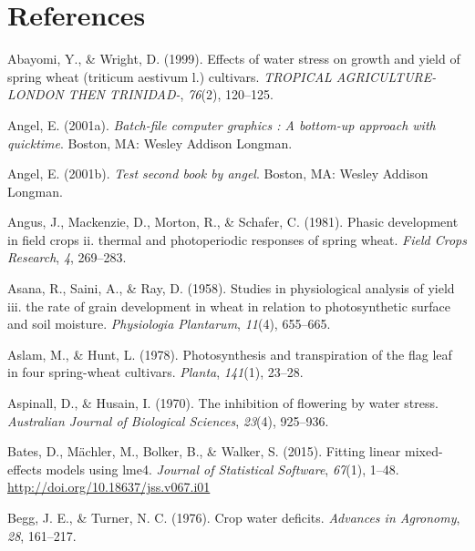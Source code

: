 \documentclass[12pt,oneside]{dukestatscithesis} %
\theoremstyle{definition}
\theoremstyle{definition}
\theoremstyle{definition}
\theoremstyle{remark}
\begin{document}
\chapter*{References}\label{references}


\noindent

\setlength{\parindent}{-0.20in} \setlength{\leftskip}{0.20in}
\setlength{\parskip}{8pt}

\hypertarget{refs}{}
\hypertarget{ref-abayomi1999effects}{}
Abayomi, Y., \& Wright, D. (1999). Effects of water stress on growth and
yield of spring wheat (triticum aestivum l.) cultivars. \emph{TROPICAL
AGRICULTURE-LONDON THEN TRINIDAD-}, \emph{76}(2), 120--125.

\hypertarget{ref-angel2001}{}
Angel, E. (2001a). \emph{Batch-file computer graphics : A bottom-up
approach with quicktime}. Boston, MA: Wesley Addison Longman.

\hypertarget{ref-angel2002a}{}
Angel, E. (2001b). \emph{Test second book by angel}. Boston, MA: Wesley
Addison Longman.

\hypertarget{ref-angus1981phasic}{}
Angus, J., Mackenzie, D., Morton, R., \& Schafer, C. (1981). Phasic
development in field crops ii. thermal and photoperiodic responses of
spring wheat. \emph{Field Crops Research}, \emph{4}, 269--283.

\hypertarget{ref-asana1958studies}{}
Asana, R., Saini, A., \& Ray, D. (1958). Studies in physiological
analysis of yield iii. the rate of grain development in wheat in
relation to photosynthetic surface and soil moisture. \emph{Physiologia
Plantarum}, \emph{11}(4), 655--665.

\hypertarget{ref-aslam1978photosynthesis}{}
Aslam, M., \& Hunt, L. (1978). Photosynthesis and transpiration of the
flag leaf in four spring-wheat cultivars. \emph{Planta}, \emph{141}(1),
23--28.

\hypertarget{ref-aspinall1970inhibition}{}
Aspinall, D., \& Husain, I. (1970). The inhibition of flowering by water
stress. \emph{Australian Journal of Biological Sciences}, \emph{23}(4),
925--936.

\hypertarget{ref-bates2014fitting}{}
Bates, D., Mächler, M., Bolker, B., \& Walker, S. (2015). Fitting linear
mixed-effects models using lme4. \emph{Journal of Statistical Software},
\emph{67}(1), 1--48. \url{http://doi.org/10.18637/jss.v067.i01}

\hypertarget{ref-begg1976crop}{}
Begg, J. E., \& Turner, N. C. (1976). Crop water deficits.
\emph{Advances in Agronomy}, \emph{28}, 161--217.
\end{document}
